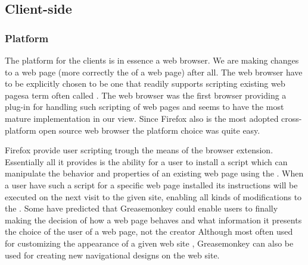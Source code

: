 \subsection{Client-side}

\subsubsection{Platform}
\label{section:selection.stack.client.platform}

The platform for the clients is in essence a web browser. We are making
changes to a web page (more correctly the  of a web page)
after all. The web browser have to be explicitly chosen
to be one that readily supports scripting existing
web pages\dash{}a term often called .
The %
web browser was the first browser providing a
plug-in for handling such scripting of web pages and seems to have the most
mature implementation in our view. Since Firefox also is the
most adopted%
cross-platform open source web browser the platform choice was quite easy.

Firefox provide user scripting trough the means of the
%
browser extension. Essentially all it provides is the ability for a user to
install a script which can manipulate the behavior and properties of an
existing web page using the %
.
When a user have such a script for a specific web page installed its
instructions will be executed on the next visit to the given site, enabling
all kinds of modifications to the .
Some have predicted that Greasemonkey could enable users to
finally \dash{}making the decision of how a web page
behaves and what information it presents the choice of the user of a web page,
not the creator \citep[pp.~3--4.]{filman06}
Although most often used
for customizing the appearance of a given web site \citep[p.~39]{vitali06},
Greasemonkey can also be used for creating new navigational designs on the
\urort{} web site.

